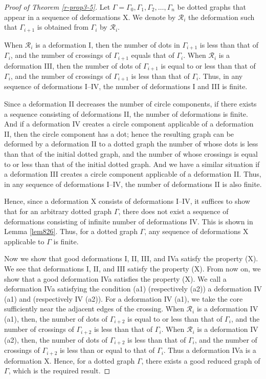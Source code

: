 \documentclass[a4paper,11pt]{amsart}
\numberwithin{equation}{section}
\begin{document}
 

\begin{proof}[
Proof of Theorem \ref{r-prop3-5}]

 

Let $\Gamma=\Gamma_0, \Gamma_1, \Gamma_2, \ldots, \Gamma_n$ be dotted graphs that appear in a sequence of deformations X. 
We denote by $\mathcal{R}_i$ the deformation such that $\Gamma_{i+1}$ is obtained from $\Gamma_i$ by $\mathcal{R}_i$. 
 
When $\mathcal{R}_i$ is a deformation I, then the number of dots in ${\Gamma}_{i+1}$ is less than that of ${\Gamma}_{i}$, and the number of crossings of ${\Gamma}_{i+1}$ equals that of ${\Gamma}_{i}$. 
When $\mathcal{R}_i$ is a deformation III, then the number of dots of  ${\Gamma}_{i+1}$ is equal to or less than that of ${\Gamma}_{i}$, and the number of crossings of ${\Gamma}_{i+1}$ is less than that of ${\Gamma}_{i}$. 
Thus, in any sequence of deformations I--IV, the number of deformations I and III is finite. 

Since a deformation II decreases the number of circle components, 
if there exists a sequence consisting of deformations II, the number of deformations is finite. 
And if a deformation IV creates a circle component applicable of a deformation II, then the circle component has a dot; hence the resulting graph can be deformed by a deformation II to a dotted graph the number of whose dots is less than that of the initial dotted graph, and the number of whose crossings is equal to or less than that of the initial dotted graph. And we have a similar situation if a deformation III creates a circle component applicable of a deformation II. Thus, in any sequence of deformations I--IV, the number of deformations II is also finite. 

Hence, since a deformation X consists of deformations I--IV, 
it suffices to show that for an arbitrary dotted graph $\Gamma$, there does not exist a sequence of deformations consisting of 
infinite number of deformations IV. 
This is shown in Lemma \ref{lem826}. Thus, for a dotted graph $\Gamma$, any sequence of deformations X applicable to $\Gamma$ is finite. 

Now we show that good deformations I, II, III, and IVa satisfy the property (X). We see that deformations I, II, and III satisfy the property (X). From now on, we show that a good deformation IVa satisfies the property (X). 
We call a deformation IVa satisfying the condition (a1) (respectively (a2)) a deformation IV (a1) and (respectively IV (a2)). For a deformation IV (a1), we take the core sufficiently near the adjacent edges of the crossing. 
When $\mathcal{R}_i$ is a deformation IV (a1), then, the number of dots of $\Gamma_{i+2}$ is equal to or less than that of ${\Gamma}_{i}$, and the number of crossings of $\Gamma_{i+2}$ 
is less than that of $\Gamma_i$. When $\mathcal{R}_i$ is a deformation IV (a2), then, the number of dots of $\Gamma_{i+2}$ is less than that of ${\Gamma}_{i}$, and the number of crossings of $\Gamma_{i+2}$ 
is less than or equal to that of $\Gamma_i$. 
Thus a deformation IVa is a deformation X. 
Hence, for a dotted graph $\Gamma$, there exists a good reduced graph of $\Gamma$, which is the required result. 
\end{proof}
\end{document}
